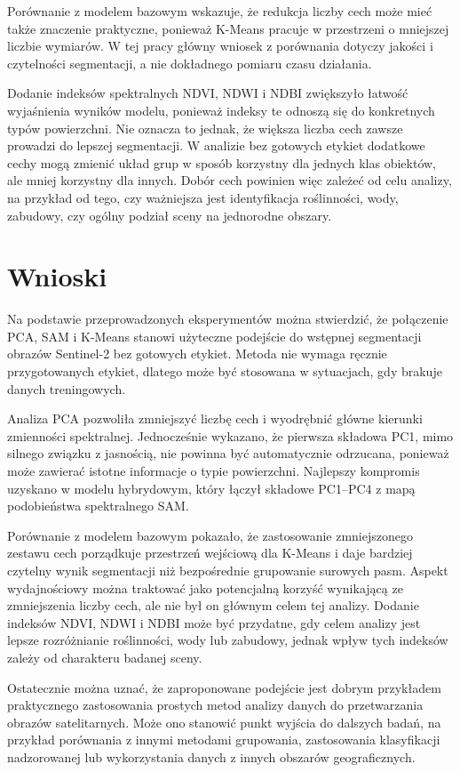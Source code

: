 \documentclass[12pt,a4paper]{article}
\begin{document}
	Porównanie z modelem bazowym wskazuje, że redukcja liczby cech może mieć także znaczenie praktyczne, ponieważ K-Means pracuje w przestrzeni o mniejszej liczbie wymiarów. W tej pracy główny wniosek z porównania dotyczy jakości i czytelności segmentacji, a nie dokładnego pomiaru czasu działania.
	
	Dodanie indeksów spektralnych NDVI, NDWI i NDBI zwiększyło łatwość wyjaśnienia wyników modelu, ponieważ indeksy te odnoszą się do konkretnych typów powierzchni. Nie oznacza to jednak, że większa liczba cech zawsze prowadzi do lepszej segmentacji. W analizie bez gotowych etykiet dodatkowe cechy mogą zmienić układ grup w sposób korzystny dla jednych klas obiektów, ale mniej korzystny dla innych. Dobór cech powinien więc zależeć od celu analizy, na przykład od tego, czy ważniejsza jest identyfikacja roślinności, wody, zabudowy, czy ogólny podział sceny na jednorodne obszary.
	
	\section{Wnioski}
\label{sec:wnioski}
	
	Na podstawie przeprowadzonych eksperymentów można stwierdzić, że połączenie PCA, SAM i K-Means stanowi użyteczne podejście do wstępnej segmentacji obrazów Sentinel-2 bez gotowych etykiet. Metoda nie wymaga ręcznie przygotowanych etykiet, dlatego może być stosowana w sytuacjach, gdy brakuje danych treningowych.
	
	Analiza PCA pozwoliła zmniejszyć liczbę cech i wyodrębnić główne kierunki zmienności spektralnej. Jednocześnie wykazano, że pierwsza składowa PC1, mimo silnego związku z jasnością, nie powinna być automatycznie odrzucana, ponieważ może zawierać istotne informacje o typie powierzchni. Najlepszy kompromis uzyskano w modelu hybrydowym, który łączył składowe PC1--PC4 z mapą podobieństwa spektralnego SAM.
	
	Porównanie z modelem bazowym pokazało, że zastosowanie zmniejszonego zestawu cech porządkuje przestrzeń wejściową dla K-Means i daje bardziej czytelny wynik segmentacji niż bezpośrednie grupowanie surowych pasm. Aspekt wydajnościowy można traktować jako potencjalną korzyść wynikającą ze zmniejszenia liczby cech, ale nie był on głównym celem tej analizy. Dodanie indeksów NDVI, NDWI i NDBI może być przydatne, gdy celem analizy jest lepsze rozróżnianie roślinności, wody lub zabudowy, jednak wpływ tych indeksów zależy od charakteru badanej sceny.
	
	Ostatecznie można uznać, że zaproponowane podejście jest dobrym przykładem praktycznego zastosowania prostych metod analizy danych do przetwarzania obrazów satelitarnych. Może ono stanowić punkt wyjścia do dalszych badań, na przykład porównania z innymi metodami grupowania, zastosowania klasyfikacji nadzorowanej lub wykorzystania danych z innych obszarów geograficznych.
	
\end{document}
